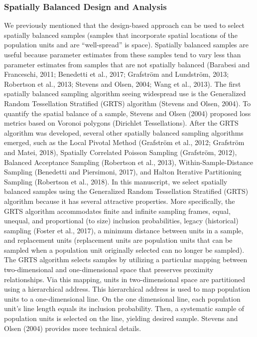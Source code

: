 \documentclass[]{elsarticle} %
\begin{document}
\hypertarget{subsec:spb_design}{%
\subsubsection{Spatially Balanced Design and
Analysis}\label{subsec:spb_design}}

We previously mentioned that the design-based approach can be used to
select spatially balanced samples (samples that incorporate spatial
locations of the population units and are ``well-spread'' is space).
Spatially balanced samples are useful because parameter estimates from
these samples tend to vary less than parameter estimates from samples
that are not spatially balanced (Barabesi and Franceschi, 2011;
Benedetti et al., 2017; Grafström and Lundström, 2013; Robertson et al.,
2013; Stevens and Olsen, 2004; Wang et al., 2013). The first spatially
balanced sampling algorithm seeing widespread use is the Generalized
Random Tessellation Stratified (GRTS) algorithm (Stevens and Olsen,
2004). To quantify the spatial balance of a sample, Stevens and Olsen
(2004) proposed loss metrics based on Voronoi polygons (Dirichlet
Tessellations). After the GRTS algorithm was developed, several other
spatially balanced sampling algorithms emerged, such as the Local
Pivotal Method (Grafström et al., 2012; Grafström and Matei, 2018),
Spatially Correlated Poisson Sampling (Grafström, 2012), Balanced
Acceptance Sampling (Robertson et al., 2013), Within-Sample-Distance
Sampling (Benedetti and Piersimoni, 2017), and Halton Iterative
Partitioning Sampling (Robertson et al., 2018). In this manuscript, we
select spatially balanced samples using the Generalized Random
Tessellation Stratified (GRTS) algorithm because it has several
attractive properties. More specifically, the GRTS algorithm
accommodates finite and infinite sampling frames, equal, unequal, and
proportional (to size) inclusion probabilities, legacy (historical)
sampling (Foster et al., 2017), a minimum distance between units in a
sample, and replacement units (replacement units are population units
that can be sampled when a population unit originally selected can no
longer be sampled). The GRTS algorithm selects samples by utilizing a
particular mapping between two-dimensional and one-dimensional space
that preserves proximity relationships. Via this mapping, units in
two-dimensional space are partitioned using a hierarchical address. This
hierarchical address is used to map population units to a
one-dimensional line. On the one dimensional line, each population
unit's line length equals its inclusion probability. Then, a systematic
sample of population units is selected on the line, yielding desired
sample. Stevens and Olsen (2004) provides more technical details.
\end{document}
